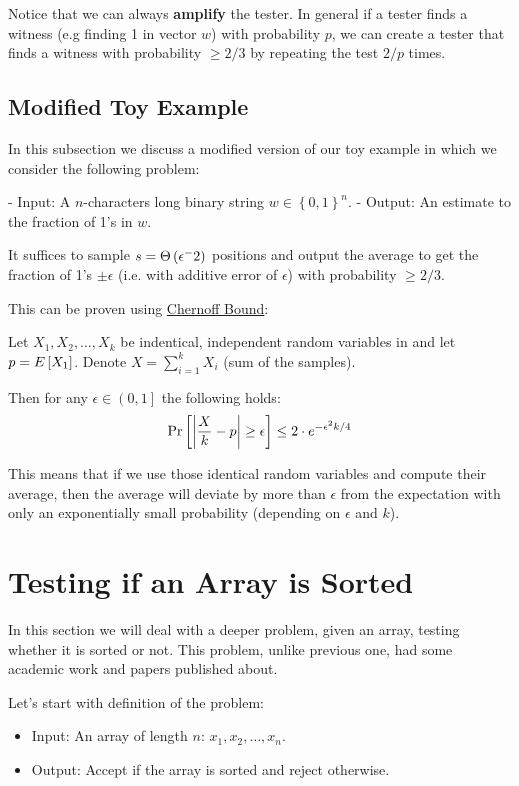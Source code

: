 Notice that we can always \textbf{amplify} the tester.
In general if a tester finds a witness (e.g finding 1 in vector $w$) with probability $p$, we can create a tester that finds a witness with probability $\geq 2/3$ by repeating the test $2/p$ times.

\subsection{Modified Toy Example}

In this subsection we discuss a modified version of our toy example in which we consider the following problem:

- Input: A $n$-characters long binary string $w\in \left\{0,1\right\}^n$.
- Output: An estimate to the fraction of 1's in $w$.

It suffices to sample $s=\Theta\left(\epsilon^-2\right)$ positions and output the average to get the fraction of 1's $\pm \epsilon$ (i.e. with additive error of $\epsilon$) with probability $\geq 2/3$.

This can be proven using \href{https://en.wikipedia.org/wiki/Chernoff_bound}{Chernoff Bound}:
\begin{theorem}\label{thm:chernoff_bound}
Let $X_1,X_2,\ldots,X_k$ be indentical, independent random variables in  and let $p=E\left[X_1\right]$. Denote $X=\sum_{i=1}^kX_i$ (sum of the samples).

Then for any $\epsilon \in \left(0,1\right]$ the following holds:
\[
\text{Pr}\left[\left|\frac{X}{k}-p\right| \geq \epsilon\right] \leq 2\cdot e^{-\epsilon^2k/4}
\]
\end{theorem}

This means that if we use those identical random variables and compute their average, then the average will deviate by more than $\epsilon$ from the expectation with only an exponentially small probability (depending on $\epsilon$ and $k$).

\section{Testing if an Array is Sorted}

In this section we will deal with a deeper problem, given an array, testing whether it is sorted or not. This problem, unlike previous one, had some academic work and papers published about.

Let's start with definition of the problem:
\begin{itemize}
    \item Input: An array of length $n$: $x_1,x_2,\ldots, x_n$.
    \item Output: Accept if the array is sorted and reject otherwise.
\end{itemize}


